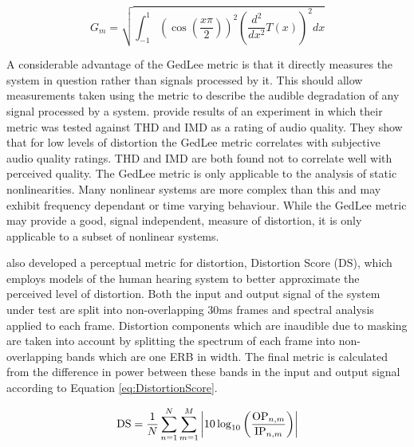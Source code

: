 		\begin{equation}
			G_{m} = \sqrt{\int_{-1}^{1} \left( \cos \left( \frac{x\pi}{2} \right) \right)^{2}
				      \left( \frac{d^{2}}{dx^{2}} T(x) \right)^{2} dx}
			\label{eq:gedlee}
		\end{equation}

		A considerable advantage of the GedLee metric is that it directly measures the system in question rather
		than signals processed by it. This should allow measurements taken using the metric to describe the audible
		degradation of any signal processed by a system. \citet{lee2003auditory} provide results of an experiment in
		which their metric was tested against THD and IMD as a rating of audio quality. They show that for low
		levels of distortion the GedLee metric correlates with subjective audio quality ratings. THD and IMD are
		both found not to correlate well with perceived quality. The GedLee metric is only applicable to the
		analysis of static nonlinearities. Many nonlinear systems are more complex than this and may exhibit
		frequency dependant or time varying behaviour. While the GedLee metric may provide a good, signal
		independent, measure of distortion, it is only applicable to a subset of nonlinear systems.

		\citet{tan2003the} also developed a perceptual metric for distortion, Distortion Score ($\mathrm{DS}$),
		which employs models of the human hearing system to better approximate the perceived level of distortion.
		Both the input and output signal of the system under test are split into non-overlapping 30ms frames and
		spectral analysis applied to each frame. Distortion components which are inaudible due to masking are taken
		into account by splitting the spectrum of each frame into non-overlapping bands which are one ERB in width.
		The final metric is calculated from the difference in power between these bands in the input and output
		signal according to Equation \ref{eq:DistortionScore}.

		\begin{equation}
			\mathrm{DS} = \frac{1}{N} \sum_{n = 1}^{N} \sum_{m = 1}^{M} 
				\left|10\log_{10} \left( \frac{\mathrm{OP}_{n,m}}{\mathrm{IP}_{n,m}} \right) \right|
			\label{eq:DistortionScore}
		\end{equation}
		

